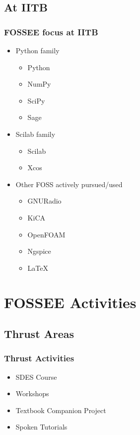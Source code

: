 \documentclass[compress,red]{beamer} %
\begin{document}
\subsection{At IITB}
\begin{frame}
\frametitle{FOSSEE focus at IITB}
\begin{itemize}
\item Python family \pause
   \begin{itemize}
   \item Python
   \item NumPy
   \item SciPy
   \item Sage \pause
   \end{itemize}
\item Scilab family \pause
   \begin{itemize}
   \item Scilab
   \item Xcos \pause
   \end{itemize}
\item Other FOSS actively pursued/used \pause
   \begin{itemize}
   \item GNURadio
   \item KiCA
   \item OpenFOAM
   \item Ngspice
   \item \LaTeX %
   \end{itemize}
\end{itemize}
\end{frame}

\section{FOSSEE Activities}

\subsection{Thrust Areas}
\begin{frame}
\frametitle{Thrust Activities}
\begin{itemize}
\item SDES Course \pause
\item Workshops  \pause
\item Textbook Companion Project  \pause
\item Spoken Tutorials \pause
\end{itemize}
\end{frame}
\end{document}
